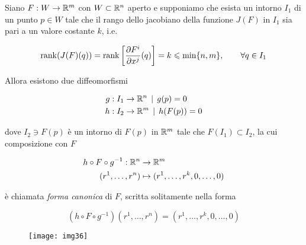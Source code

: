 \begin{theorem}
	Siano $ F : W \to \mathbb{R}^{m} $ con $ W \subset \mathbb{R}^{n} $ aperto e supponiamo che esista un intorno $ I_{1} $ di un punto $ p \in W $ tale che il rango dello jacobiano della funzione $ J(F) $ in $ I_{1} $ sia pari a un valore costante $ k $, i.e.
	
	\begin{equation}
		\rank(J(F)(q)) = \rank \left[ \dfrac{\partial F^{i}}{\partial x^{j}} (q) \right] = k \leqslant \min\{n,m\}, \qquad \forall q \in I_{1}
	\end{equation}

	Allora esistono due diffeomorfismi
	
	\begin{align}
		\begin{split}
			g : I_{1} &\to \mathbb{R}^{n} \, \mid \, g(p)=0\\
			h : I_{2} &\to \mathbb{R}^{m} \, \mid \, h(F(p))=0
		\end{split}
	\end{align}
	
	dove $ I_{2} \ni F(p) $ è un intorno di $ F(p) $ in $ \mathbb{R}^{m} $ tale che $ F(I_{1}) \subset I_{2} $, la cui composizione con $ F $
	
	\begin{align}
		\begin{split}
			h \circ F \circ g^{-1} : \mathbb{R}^{n} &\to \mathbb{R}^{m}\\
			(r^{1},\dots,r^{n}) &\mapsto (r^{1},\dots,r^{k},0,\dots,0)
		\end{split}
	\end{align}

	è chiamata \textit{forma canonica} di $ F $, scritta solitamente nella forma
	
	\begin{equation}
		(h \circ F \circ g^{-1})(r^{1},\dots,r^{n}) = (r^{1},\dots,r^{k},0,\dots,0)
	\end{equation}

	\begin{figure}[H]
		\centering
		\texttt{[image: img36]}
	\end{figure}
\end{theorem}

